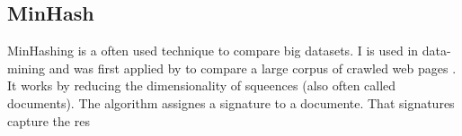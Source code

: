 \subsection{MinHash}
\label{ssec:minhash}

MinHashing is a often used technique to compare big datasets. I is used in data-mining and was first applied by \citeauthor{minhash} to compare a large corpus of crawled web pages \cite{minhash}. It works by reducing the dimensionality of squeences (also often called documents). The algorithm assignes a signature to a documente. That signatures capture the res

